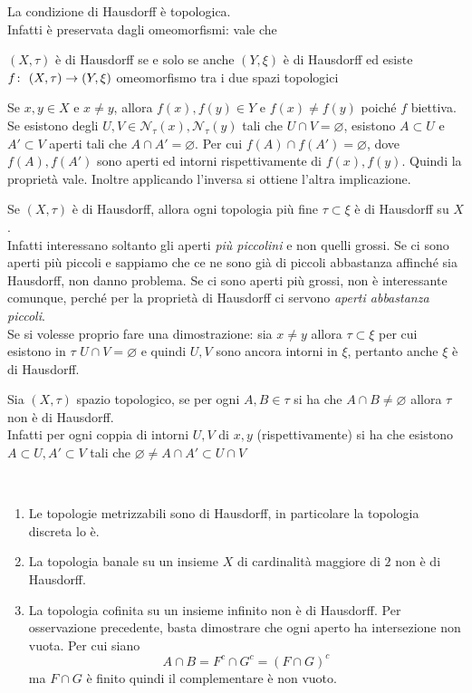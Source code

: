 \begin{remark}
	La condizione di Hausdorff è topologica. \\  Infatti è preservata dagli omeomorfismi: vale che
	\begin{center}
		$(X,\tau)$ è di Hausdorff se e solo se anche $(Y,\xi)$ è di Hausdorff ed esiste $f \colon\ (X,\tau) \rightarrow (Y,\xi)$ omeomorfismo tra i due spazi topologici
	\end{center}
	 Se $x,y \in X$ e $x\neq y$, allora $f(x), f(y) \in Y$ e $f(x) \neq f(y)$ poiché $f$ biettiva. Se esistono degli $U,V\in \mathcal{N}_\tau(x),\mathcal{N}_\tau(y)$ tali che $U \cap V = \varnothing$, esistono $A \subset U$ e $A' \subset V$ aperti tali che $A \cap A' = \varnothing$. Per cui $f(A) \cap f(A') = \varnothing$, dove $f(A), f(A')$ sono aperti ed intorni rispettivamente di $f(x),f(y)$. Quindi la proprietà vale. Inoltre applicando l'inversa si ottiene l'altra implicazione.
\end{remark} 
\begin{remark}
	Se $(X, \tau)$ è di Hausdorff, allora ogni topologia più fine $\tau \subset \xi$ è di Hausdorff su $X$. \\ Infatti interessano soltanto gli aperti \textit{più piccolini} e non quelli grossi. Se ci sono aperti più piccoli e sappiamo che ce ne sono già di piccoli abbastanza affinché sia Hausdorff, non danno problema. Se ci sono aperti più grossi, non è interessante comunque, perché per la proprietà di Hausdorff ci servono \textit{aperti abbastanza piccoli}. \\ Se si volesse proprio fare una dimostrazione: sia $x \neq y$ allora $\tau \subset \xi$ per cui esistono in $\tau$ $U \cap V = \varnothing$ e quindi $U, V$ sono ancora intorni in $\xi$, pertanto anche $\xi$ è di Hausdorff. 
\end{remark}
\begin{remark}
	Sia $(X, \tau)$ spazio topologico, se per ogni $A, B\in \tau$ si ha che $A\cap B \neq \varnothing$ allora $\tau$ non è di Hausdorff. \\ Infatti per ogni coppia di intorni $U, V$ di $x, y$ (rispettivamente) si ha che esistono $A \subset U, A' \subset V$ tali che $\varnothing \neq A\cap A' \subset U \cap V$
\end{remark} 

\begin{example} \
\begin{enumerate}
	\item Le topologie metrizzabili sono di Hausdorff, in particolare la topologia discreta lo è. 
	\item La topologia banale su un insieme $X$ di cardinalità maggiore di $2$ non è di Hausdorff. 
	\item La topologia cofinita su un insieme infinito non è di Hausdorff. Per osservazione precedente, basta dimostrare che ogni aperto ha intersezione non vuota. Per cui siano 
	\begin{equation*}
	A \cap B = F^c \cap G^c = (F \cap G)^c 
	\end{equation*}
	ma $F\cap G$ è finito quindi il complementare è non vuoto. 
\end{enumerate}
\end{example}

